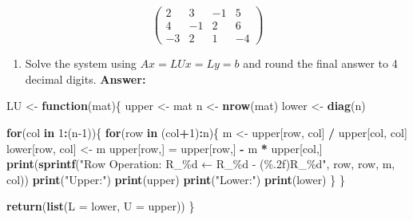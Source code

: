 \documentclass[
]{article}
\newenvironment{Shaded}{\begin{snugshade}}{\end{snugshade}}
\newcommand{\AttributeTok}[1]{\textcolor[rgb]{0.13,0.29,0.53}{#1}}
\newcommand{\ControlFlowTok}[1]{\textcolor[rgb]{0.13,0.29,0.53}{\textbf{#1}}}
\newcommand{\DecValTok}[1]{\textcolor[rgb]{0.00,0.00,0.81}{#1}}
\newcommand{\FunctionTok}[1]{\textcolor[rgb]{0.13,0.29,0.53}{\textbf{#1}}}
\newcommand{\NormalTok}[1]{#1}
\newcommand{\OtherTok}[1]{\textcolor[rgb]{0.56,0.35,0.01}{#1}}
\newcommand{\SpecialCharTok}[1]{\textcolor[rgb]{0.81,0.36,0.00}{\textbf{#1}}}
\newcommand{\StringTok}[1]{\textcolor[rgb]{0.31,0.60,0.02}{#1}}
\providecommand{\tightlist}{%
  \setlength{\itemsep}{0pt}\setlength{\parskip}{0pt}}
\begin{document}
\[
\boxed{
\left(
\begin{array}{ccc|c}
2 & 3 & -1 & 5 \\
4 & -1 & 2 & 6 \\
-3 & 2 & 1 & -4
\end{array}
\right)
}
\]

\begin{enumerate}
\def\labelenumi{\alph{enumi}.}
\setcounter{enumi}{1}
\tightlist
\item
  Solve the system using \(Ax=LUx=Ly=b\) and round the final answer to 4
  decimal digits. \textbf{Answer:}
\end{enumerate}

\begin{Shaded}
\begin{Highlighting}[]
\NormalTok{LU }\OtherTok{\textless{}{-}} \ControlFlowTok{function}\NormalTok{(mat)\{}
\NormalTok{  upper }\OtherTok{\textless{}{-}}\NormalTok{ mat}
\NormalTok{  n }\OtherTok{\textless{}{-}} \FunctionTok{nrow}\NormalTok{(mat)}
\NormalTok{  lower }\OtherTok{\textless{}{-}} \FunctionTok{diag}\NormalTok{(n)}
  
  \ControlFlowTok{for}\NormalTok{(col }\ControlFlowTok{in} \DecValTok{1}\SpecialCharTok{:}\NormalTok{(n}\DecValTok{{-}1}\NormalTok{))\{}
    \ControlFlowTok{for}\NormalTok{(row }\ControlFlowTok{in}\NormalTok{ (col}\SpecialCharTok{+}\DecValTok{1}\NormalTok{)}\SpecialCharTok{:}\NormalTok{n)\{}
\NormalTok{      m }\OtherTok{\textless{}{-}}\NormalTok{ upper[row, col] }\SpecialCharTok{/}\NormalTok{ upper[col, col]}
\NormalTok{      lower[row, col] }\OtherTok{\textless{}{-}}\NormalTok{ m}
\NormalTok{      upper[row,] }\OtherTok{=}\NormalTok{ upper[row,] }\SpecialCharTok{{-}}\NormalTok{ m }\SpecialCharTok{*}\NormalTok{ upper[col,]}
      \FunctionTok{print}\NormalTok{(}\FunctionTok{sprintf}\NormalTok{(}\StringTok{"Row Operation: R\_\%d ← R\_\%d {-} (\%.2f)R\_\%d"}\NormalTok{, row, row, m, col))}
      \FunctionTok{print}\NormalTok{(}\StringTok{"Upper:"}\NormalTok{)}
      \FunctionTok{print}\NormalTok{(upper)}
      \FunctionTok{print}\NormalTok{(}\StringTok{"Lower:"}\NormalTok{)}
      \FunctionTok{print}\NormalTok{(lower)}
\NormalTok{    \}}
\NormalTok{  \}}
  
  \FunctionTok{return}\NormalTok{(}\FunctionTok{list}\NormalTok{(}\AttributeTok{L =}\NormalTok{ lower, }\AttributeTok{U =}\NormalTok{ upper))}
\NormalTok{\}}


\end{Highlighting}
\end{Shaded}
\end{document}
